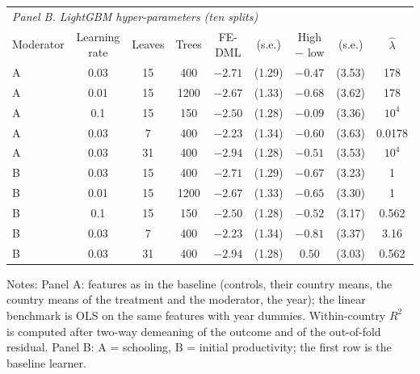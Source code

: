 \documentclass[preprint,12pt,authoryear]{elsarticle}
\begin{document}
\begin{table}[!ht]
\begin{threeparttable}
\medskip
\begin{tabular}{lcccccccc}
\toprule
\multicolumn{9}{l}{\textit{Panel B. LightGBM hyper-parameters (ten splits)}}\\
Moderator & Learning rate & Leaves & Trees & FE-DML & (s.e.) & High $-$ low & (s.e.) & $\hat\lambda$\\
\midrule
A & 0.03 & 15 & 400 & $-2.71$ & (1.29) & $-0.47$ & (3.53) & 178\\
A & 0.01 & 15 & 1200 & $-2.67$ & (1.33) & $-0.68$ & (3.62) & 178\\
A & 0.1 & 15 & 150 & $-2.50$ & (1.28) & $-0.09$ & (3.36) & $10^{4}$\\
A & 0.03 & 7 & 400 & $-2.23$ & (1.34) & $-0.60$ & (3.63) & 0.0178\\
A & 0.03 & 31 & 400 & $-2.94$ & (1.28) & $-0.51$ & (3.53) & $10^{4}$\\
B & 0.03 & 15 & 400 & $-2.71$ & (1.29) & $-0.67$ & (3.23) & 1\\
B & 0.01 & 15 & 1200 & $-2.67$ & (1.33) & $-0.65$ & (3.30) & 1\\
B & 0.1 & 15 & 150 & $-2.50$ & (1.28) & $-0.52$ & (3.17) & 0.562\\
B & 0.03 & 7 & 400 & $-2.23$ & (1.34) & $-0.81$ & (3.37) & 3.16\\
B & 0.03 & 31 & 400 & $-2.94$ & (1.28) & $0.50$ & (3.03) & 0.562\\
\bottomrule
\end{tabular}
\begin{tablenotes}\scriptsize
\item Notes: Panel A: features as in the baseline (controls, their country means, the country means of the treatment and the moderator, the year); the linear benchmark is OLS on the same features with year dummies. Within-country $R^2$ is computed after two-way demeaning of the outcome and of the out-of-fold residual. Panel B: A = schooling, B = initial productivity; the first row is the baseline learner.
\end{tablenotes}
\end{threeparttable}
\end{table}
\end{document}
